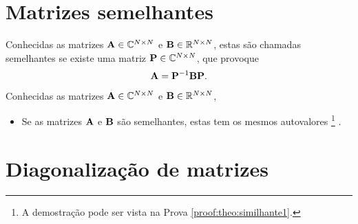 \section{Matrizes semelhantes}


\begin{definition}\label{def:similhante0}
Conhecidas as matrizes  $\MATRIX{A} \in \mathbb{C}^{N \times N}$ e $\MATRIX{B} \in \mathbb{R}^{N \times N}$,
estas são chamadas semelhantes \cite[pp. 67]{golub2013matrix} se existe uma matriz $\MATRIX{P} \in \mathbb{C}^{N \times N}$, que provoque
\begin{equation}
\MATRIX{A} = \MATRIX{P}^{-1} \MATRIX{B} \MATRIX{P}.
\end{equation}
\end{definition}

\begin{theorem}\label{theo:similhante1}
Conhecidas as matrizes $\MATRIX{A} \in \mathbb{C}^{N \times N}$ e $\MATRIX{B} \in \mathbb{R}^{N \times N}$,
\begin{itemize}
\item Se as matrizes $\MATRIX{A}$ e $\MATRIX{B}$ são semelhantes, estas tem os mesmos autovalores
\footnote{A demostração pode ser vista na Prova \ref{proof:theo:similhante1}.} \cite[pp. 67]{golub2013matrix}.
\end{itemize}
\end{theorem}

\section{Diagonalização de matrizes}

